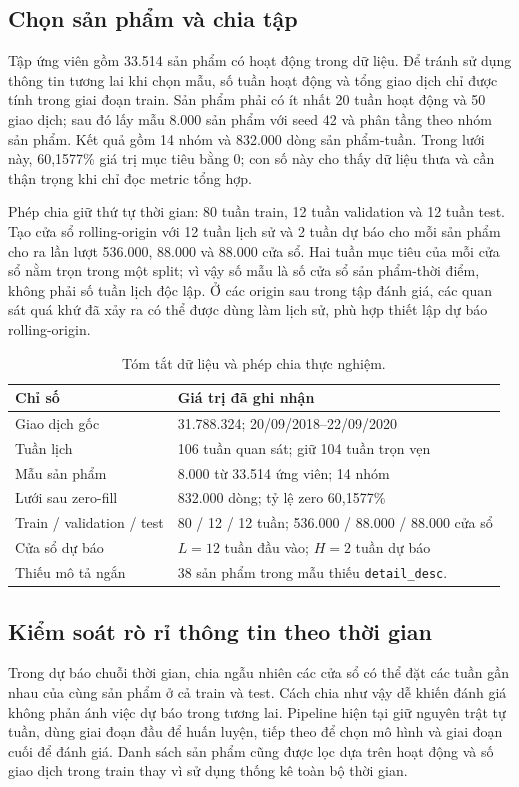 \documentclass[12pt,a4paper,oneside]{article}
\begin{document}
\subsection{Chọn sản phẩm và chia tập}
Tập ứng viên gồm 33.514 sản phẩm có hoạt động trong dữ liệu. Để tránh sử dụng thông tin tương lai khi chọn mẫu, số tuần hoạt động và tổng giao dịch chỉ được tính trong giai đoạn train. Sản phẩm phải có ít nhất 20 tuần hoạt động và 50 giao dịch; sau đó lấy mẫu 8.000 sản phẩm với seed 42 và phân tầng theo nhóm sản phẩm. Kết quả gồm 14 nhóm và 832.000 dòng sản phẩm-tuần. Trong lưới này, 60,1577\% giá trị mục tiêu bằng 0; con số này cho thấy dữ liệu thưa và cần thận trọng khi chỉ đọc metric tổng hợp.

Phép chia giữ thứ tự thời gian: 80 tuần train, 12 tuần validation và 12 tuần test. Tạo cửa sổ rolling-origin với 12 tuần lịch sử và 2 tuần dự báo cho mỗi sản phẩm cho ra lần lượt 536.000, 88.000 và 88.000 cửa sổ. Hai tuần mục tiêu của mỗi cửa sổ nằm trọn trong một split; vì vậy số mẫu là số cửa sổ sản phẩm-thời điểm, không phải số tuần lịch độc lập. Ở các origin sau trong tập đánh giá, các quan sát quá khứ đã xảy ra có thể được dùng làm lịch sử, phù hợp thiết lập dự báo rolling-origin.

\begin{table}[!htbp]
\centering
\caption{Tóm tắt dữ liệu và phép chia thực nghiệm.}
\label{tab:data}
\begin{tabular}{p{}p{}}
\toprule
Chỉ số & Giá trị đã ghi nhận \\
\midrule
Giao dịch gốc & 31.788.324; 20/09/2018--22/09/2020 \\
Tuần lịch & 106 tuần quan sát; giữ 104 tuần trọn vẹn \\
Mẫu sản phẩm & 8.000 từ 33.514 ứng viên; 14 nhóm \\
Lưới sau zero-fill & 832.000 dòng; tỷ lệ zero 60,1577\% \\
Train / validation / test & 80 / 12 / 12 tuần; 536.000 / 88.000 / 88.000 cửa sổ \\
Cửa sổ dự báo & $L=12$ tuần đầu vào; $H=2$ tuần dự báo \\
Thiếu mô tả ngắn & 38 sản phẩm trong mẫu thiếu \texttt{detail\_desc}. \\
\bottomrule
\end{tabular}
\end{table}

\subsection{Kiểm soát rò rỉ thông tin theo thời gian}
Trong dự báo chuỗi thời gian, chia ngẫu nhiên các cửa sổ có thể đặt các tuần gần nhau của cùng sản phẩm ở cả train và test. Cách chia như vậy dễ khiến đánh giá không phản ánh việc dự báo trong tương lai. Pipeline hiện tại giữ nguyên trật tự tuần, dùng giai đoạn đầu để huấn luyện, tiếp theo để chọn mô hình và giai đoạn cuối để đánh giá. Danh sách sản phẩm cũng được lọc dựa trên hoạt động và số giao dịch trong train thay vì sử dụng thống kê toàn bộ thời gian.
\end{document}
